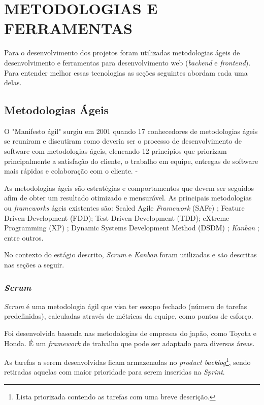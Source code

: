 \chapter{METODOLOGIAS E FERRAMENTAS}
\label{cap:elementos}

Para o desenvolvimento dos projetos foram utilizadas metodologias ágeis de desenvolvimento e ferramentas para desenvolvimento web (\textit{backend} e \textit{frontend}). Para entender melhor essas tecnologias as seções seguintes abordam cada uma delas.
\section{Metodologias Ágeis}

O "Manifesto ágil" surgiu em 2001 quando 17 conhecedores de metodologias ágeis se reuniram e discutiram como deveria ser o processo de desenvolvimento de software com metodologias ágeis, elencando 12 princípios que priorizam principalmente a satisfação do cliente, o trabalho em equipe, entregas de software mais rápidas e colaboração com o cliente. - \cite{manifestoAgil}

As metodologias ágeis são estratégias e comportamentos que devem ser seguidos afim de obter um resultado otimizado e mensurável. 
As principais metodologias ou \textit{frameworks} ágeis existentes são: 
Scaled Agile \textit{Framework} (SAFe) \cite{hayes2016scaling};
Feature Driven-Development (FDD)\cite{fdd};
Test Driven Development (TDD)\cite{beck2003test};
eXtreme Programming (XP) \cite{wildt2015extreme};
Dynamic Systems Development Method (DSDM) \cite{stapleton1997dsdm};
\textit{Kanban} \cite{boeg2010kanban};
entre outros.

No contexto do estágio descrito, \textit{Scrum} e \textit{Kanban} foram utilizadas e são descritas nas seções a seguir.
\subsection{\textit{Scrum}}

\textit{Scrum} é uma metodologia ágil que visa ter escopo fechado (número de tarefas predefinidas), calculadas através de métricas da equipe, como pontos de esforço.

Foi desenvolvida baseada nas metodologias de empresas do japão, como Toyota e Honda. É um \textit{framework} de trabalho que pode ser adaptado para diversas áreas.

As tarefas a serem desenvolvidas ficam armazenadas no \textit{product backlog}\footnote{Lista priorizada contendo as tarefas com uma breve descrição.}, sendo retiradas aquelas com maior prioridade para serem inseridas na \textit{Sprint}.

